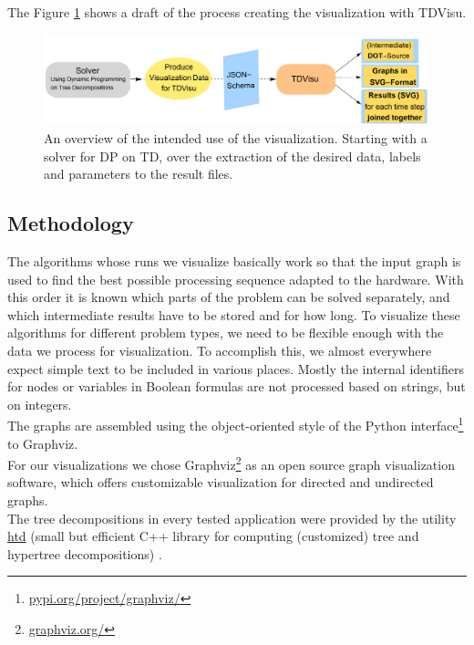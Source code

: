 \documentclass[a4paper, 12pt, bibliography=totoc]{scrartcl}
\begin{document}
The Figure \ref{fig:overviewprog} shows a draft of the process creating the visualization with TDVisu.

\begin{figure}
	\centering
		\includegraphics[width=1\linewidth]{images/OverviewProgram.png}
		
	\caption{An overview of the intended use of the visualization. Starting with a solver for DP on TD, over the extraction of the desired data, labels and parameters to the result files.}
	\label{fig:overviewprog}
\end{figure}


\subsection{Methodology}

The algorithms whose runs we visualize basically work so that the input graph is used to find the best possible processing sequence adapted to the hardware.
With this order it is known which parts of the problem can be solved separately, and which intermediate results have to be stored and for how long. To visualize these algorithms for different problem types, we need to be flexible enough with the data we process for visualization. To accomplish this, we almost everywhere expect simple text to be included in various places. Mostly the internal identifiers for nodes or variables in Boolean formulas are not processed based on strings, but on integers.\\

The graphs are assembled using the object-oriented style of the Python interface\footnote{\url{pypi.org/project/graphviz/}} to Graphviz.\\

For our visualizations we chose {Graphviz}\footnote{\url{graphviz.org/}} as an open source graph visualization software, which offers customizable visualization for directed and undirected graphs.\\

The tree decompositions in every tested application were provided by the utility \href{github.com/mabseher/htd}{htd} (small but efficient C++ library for computing (customized) tree and hypertree decompositions) \cite{htd}.\\
\end{document}

